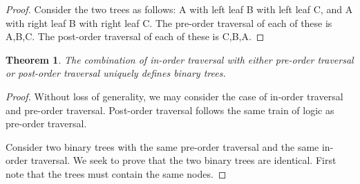 \documentclass[12pt]{article}
\newtheorem{theorem}{Theorem}[section]
\theoremstyle{definition}
\theoremstyle{remark}
\begin{document}
\begin{proof}
Consider the two trees as follows: A with left leaf B with left leaf C, and A with right leaf B with right leaf C. The pre-order traversal of each of these is A,B,C. The post-order traversal of each of these is C,B,A.
\end{proof}

\begin{theorem}
The combination of in-order traversal with either pre-order traversal or post-order traversal uniquely defines binary trees.
\end{theorem}

\begin{proof}
Without loss of generality, we may consider the case of in-order traversal and pre-order traversal. Post-order traversal follows the same train of logic as pre-order traversal.

Consider two binary trees with the same pre-order traversal and the same in-order traversal. We seek to prove that the two binary trees are identical. First note that the trees must contain the same nodes.
\end{proof}
\end{document}

